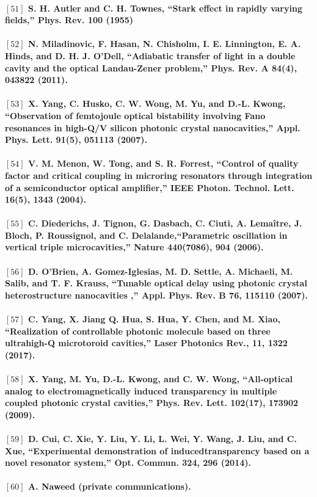 \paragraph{\normalfont \large $[51]$ S. H. Autler and C. H. Townes, “Stark effect in rapidly varying fields,” Phys. Rev. \textbf{100} (1955) \\ 
\\$[52]$  N. Miladinovic, F. Hasan, N. Chisholm, I. E. Linnington, E. A. Hinds, and D. H. J. O’Dell, “Adiabatic transfer of light in a double cavity and the optical Landau-Zener problem,” Phys. Rev. A \textbf{84}(4), 043822 (2011).\\
\\$[53]$ X. Yang, C. Husko, C. W. Wong, M. Yu, and D.-L. Kwong, “Observation of femtojoule optical bistability
involving Fano resonances in high-Q/V silicon photonic crystal nanocavities,” Appl. Phys. Lett. \textbf{91}(5), 051113
(2007).\\
\\$[54]$  V. M. Menon, W. Tong, and S. R. Forrest, “Control of quality factor and critical coupling in microring resonators
through integration of a semiconductor optical amplifier,” IEEE Photon. Technol. Lett. \textbf{16}(5), 1343 (2004).\\
\\$[55]$ C. Diederichs, J. Tignon, G. Dasbach, C. Ciuti, A. Lemaître, J. Bloch, P. Roussignol, and C. Delalande,“Parametric oscillation in vertical triple microcavities,” Nature \textbf{440}(7086), 904 (2006).\\
\\$[56]$ D. O’Brien, A. Gomez-Iglesias, M. D. Settle, A. Michaeli, M. Salib, and T. F. Krauss, “Tunable optical delay using photonic crystal heterostructure nanocavities ,” Appl. Phys. Rev. B \textbf{76}, 115110 (2007).\\
\\$[57]$ C. Yang,  X. Jiang Q. Hua, S. Hua, Y. Chen, and M. Xiao, “Realization of controllable photonic molecule based on three ultrahigh-Q microtoroid cavities,” Laser Photonics Rev., \textbf{11}, 1322 (2017).\\
\\$[58]$ X. Yang, M. Yu, D.-L. Kwong, and C. W. Wong, “All-optical analog to electromagnetically induced
transparency in multiple coupled photonic crystal cavities,” Phys. Rev. Lett. \textbf{102}(17), 173902 (2009).\\
\\$[59]$ D. Cui, C. Xie, Y. Liu, Y. Li, L. Wei, Y. Wang, J. Liu, and C. Xue, “Experimental demonstration of inducedtransparency based on a novel resonator system,” Opt. Commun. 324, 296 (2014).\\
\\$[60]$ A. Naweed (private communications).}